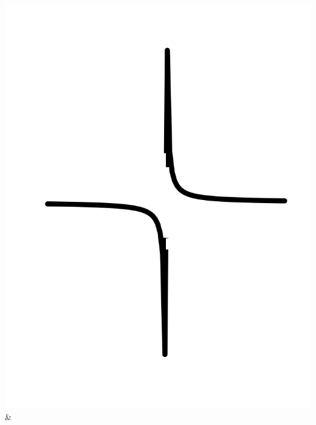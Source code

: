 \documentclass[
  letterpaper,
  DIV=11,
  numbers=noendperiod,
  oneside]{article}
\begin{document}
\begin{multicols}{2}
\begin{table}
\begin{minipage}[t]{\linewidth}
{\begin{longtable}[]
\includegraphics{Preliminaries/www/pb-recip.png} &

\end{longtable}}
\end{minipage}
\end{table}
\end{multicols}
\end{document}
